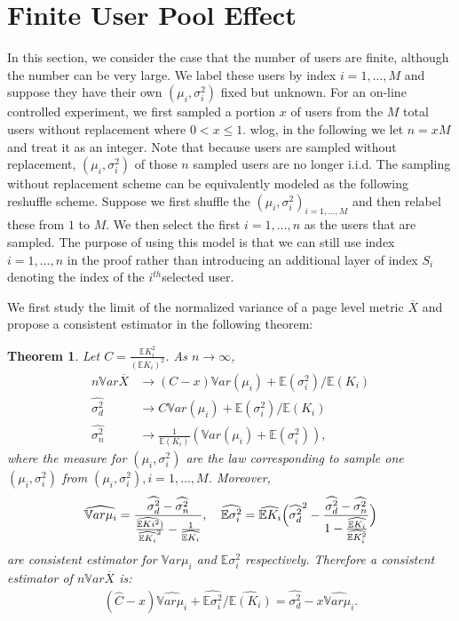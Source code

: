 \documentclass[10pt]{article}
\newcommand{\wht}{\widehat}
\newcommand{\var}{\ensuremath{\mathbb Var}}
\newcommand{\bbe}{\mathbb{E}}
\newcommand{\xbar}{\overline{X}}
\newcommand{\naiveest}{\wht{\sigma^2_n}}
\newcommand{\deltaest}{\wht{\sigma^2_d}}
\newtheorem{thm}{Theorem}
\begin{document}
\section{Finite User Pool Effect}\label{finitecase}
In this section, we consider the case that the number of users are finite, although the number can be very large. We label these users by index $i=1,\dots, M$ and suppose they have their own $(\mu_i,\sigma_i^2)$ fixed but unknown. For an on-line controlled experiment, we first sampled a portion $x$ of users from the $M$ total users without replacement where $0<x\le 1$.  wlog, in the following we let $n = xM$ and treat it as an integer. Note that because users are sampled without replacement, $(\mu_i,\sigma_i^2)$ of those $n$ sampled users are no longer i.i.d. The sampling without replacement scheme can be equivalently modeled as the following reshuffle scheme. Suppose we first shuffle the $(\mu_i,\sigma^2_i)_{i=1,\dots,M}$ and then relabel these from $1$ to $M$. We then select the first $i=1,\dots,n$  as the users that are sampled. The purpose of using this model is that we can still use index $i=1,\dots,n$ in the proof rather than introducing an additional layer of index $S_i$ denoting the index of the $i^{th}$selected user. 

We first study the limit of the normalized variance of a page level metric $\xbar$ and propose a consistent estimator in the following theorem:
\begin{thm}\label{thm2.1}
Let $C = \frac{\bbe K_i^2}{(\bbe K_i)^2}$.  As $n\to \infty$,
\begin{align}
n\var\xbar &\to (C-x) \var(\mu_i) + \bbe(\sigma^2_i)/\bbe (K_i)\label{truevar2} \\
\deltaest & \to  C \var(\mu_i) + \bbe(\sigma^2_i)/\bbe (K_i)\label{deltalim2}  \\
\naiveest & \to  \frac{1}{\bbe(K_i)} (\var(\mu_i)+\bbe(\sigma_i^2))\label{naivelim2},
\end{align}
where the measure for $(\mu_i,\sigma_i^2)$ are the law corresponding to sample one $(\mu_i,\sigma_i^2)$ from $(\mu_i,\sigma_i^2), i=1,\dots,M$. Moreover, 
\begin{align}\label{twoestimator}
\wht{\var \mu_i} = \frac{\deltaest-\naiveest}{\frac{\wht{\bbe Ki^2})}{\wht{\bbe K_i}^2}- \frac{1}{\wht{\bbe K_i}}},\quad
\wht{\bbe \sigma_i^2}  = \wht{\bbe K_i} \Bigl(\deltaest^2 -  \frac{\deltaest-\naiveest}{1- \frac{\wht{\bbe K_i}}{\wht{\bbe K_i^2}}}\Bigr)
\end{align}
are consistent estimator for $\var \mu_i$ and $\bbe \sigma_i^2$ respectively. Therefore a consistent estimator of $n\var \xbar$ is:
\begin{align*}
(\wht{C} - x) \wht{\var \mu_i} + \wht{\bbe \sigma_i^2}/\wht{\bbe (K_i)}= \deltaest - x \wht{\var \mu_i}. \tag{Formula X}
\end{align*}
\end{thm}
\end{document}
